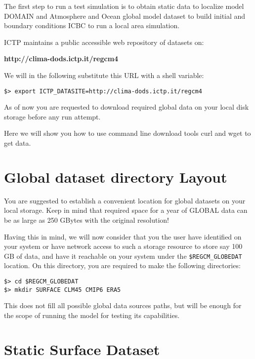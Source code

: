 %
%

\label{obtaindata}

The first step to run a test simulation is to obtain static data to localize
model DOMAIN and Atmosphere and Ocean global model dataset to build initial
and boundary conditions ICBC to run a local area simulation.

ICTP maintains a public accessible web repository of datasets on:

{\bf http://clima-dods.ictp.it/regcm4 }

We will in the following substitute this URL with a shell variable:

\begin{Verbatim}
$> export ICTP_DATASITE=http://clima-dods.ictp.it/regcm4
\end{Verbatim}

As of now you are requested to download required global data on your local disk
storage before any run attempt.

Here we will show you how to use command line download tools curl and
wget to get data.

\section{Global dataset directory Layout}

You are suggested to establish a convenient location for global datasets
on your local storage. Keep in mind that required space for a year of GLOBAL
data can be as large as 250 GBytes with the original resolution!

Having this in mind, we will now consider that you the user have identified
on your system or have network access to such a storage resource to store say
100 GB of data, and have it reachable on your system under the
\verb=$REGCM_GLOBEDAT= location.
On this directory, you are required to make the following directories:

\begin{Verbatim}
$> cd $REGCM_GLOBEDAT
$> mkdir SURFACE CLM45 CMIP6 ERA5
\end{Verbatim}

This does not fill all possible global data sources paths, but will be enough
for the scope of running the model for testing its capabilities.

\section{Static Surface Dataset}

